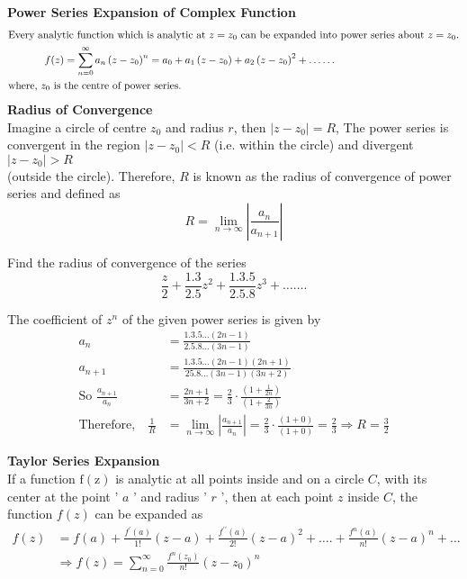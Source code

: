 \textbf{Power Series Expansion of Complex Function}
	\begin{align*}
	\intertext{Every analytic function which is analytic at $z=z_{0}$ can be expanded into power series about $z=z_{0}$.}
	f(z)&=\sum_{n=0}^{\infty} a_{n}\left(z-z_{0}\right)^{n}=a_{0}+a_{1}\left(z-z_{0}\right)+a_{2}\left(z-z_{0}\right)^{2}+\ldots \ldots\\
	\text{where, $z_{0}$ is }&\text{the centre of power series.}
\end{align*}
\textbf{Radius of Convergence}\\
Imagine a circle of centre $z_{0}$ and radius $r$, then $\left|z-z_{0}\right|=R$, 
The power series is convergent in the region $\left|z-z_{0}\right|<R$ (i.e. within the circle) and divergent $\left|z-z_{0}\right|>R$\\ (outside the circle). Therefore, $R$ is known as the radius of convergence of power series and defined as\\
$$R=\lim _{n \rightarrow \infty}\left|\frac{a_{n}}{a_{n+1}}\right|$$
\begin{exercise}
	Find the radius of convergence of the series
	$$
	\frac{z}{2}+\frac{1.3}{2.5} z^{2}+\frac{1.3 .5}{2.5 .8} z^{3}+\ldots \ldots .
	$$
\end{exercise}
\begin{answer}
	The coefficient of $z^{n}$ of the given power series is given by
	\begin{align*}
	a_{n}&=\frac{1.3 .5 \ldots(2 n-1)}{2.5 .8 \ldots(3 n-1)} \\
	a_{n+1}&=\frac{1.3 .5 \ldots(2 n-1)(2 n+1)}{25.8 \ldots(3 n-1)(3 n+2)}\\
	\text{So }\frac{a_{n+1}}{a_{n}}&=\frac{2 n+1}{3 n+2}=\frac{2}{3} \cdot \frac{\left(1+\frac{1}{2 n}\right)}{\left(1+\frac{2}{3 n}\right)}\\
	\text{Therefore,}\quad
	\frac{1}{R}&=\lim _{n \rightarrow \infty}\left|\frac{a_{n+1}}{a_{n}}\right|=\frac{2}{3} \cdot \frac{(1+0)}{(1+0)}=\frac{2}{3} \Rightarrow R=\frac{3}{2}
	\end{align*}
\end{answer}
\textbf{Taylor Series Expansion}\\
If a function $\mathrm{f}(\mathrm{z})$ is analytic at all points inside and on a circle $C$, with its center at the point ' $a$ ' and radius ' $r$ ', then at each point $z$ inside $C$, the function $f(z)$ can be expanded as
\begin{align*}
	f(z) &=f(a)+\frac{f^{\prime}(a)}{1 !}(z-a)+\frac{f^{\prime \prime}(a)}{2 !}(z-a)^{2}+\ldots .+\frac{f^{n}(a)}{n !}(z-a)^{n}+\ldots \\
	& \Rightarrow f(z)=\sum_{n=0}^{\infty} \frac{f^{n}\left(z_{0}\right)}{n !}\left(z-z_{0}\right)^{n}
\end{align*}
